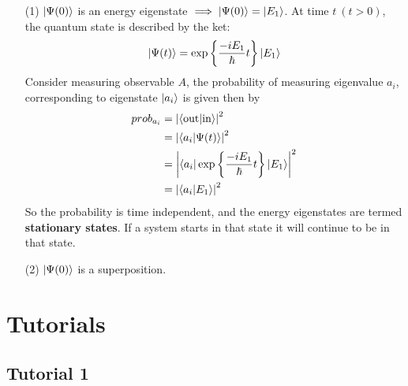 \documentclass[english, 11pt]{article}
\begin{document}
    \begin{itemize}
      \item[(1)] $\left|\Psi(0)\right\rangle$ is an energy eigenstate $\implies \left|\Psi(0)\right\rangle = \left|E_1\right\rangle$. At time $t \ (t > 0)$, the quantum state is described by the ket:
      \[ \left|\Psi(t)\right\rangle = \exp \left\{ \frac{-iE_1}{\hbar} t \right\}\left|E_1\right\rangle \]
      Consider measuring observable $A$, the probability of measuring eigenvalue $a_i$, corresponding to eigenstate $\left|a_i\right\rangle$ is given then by
      \begin{align*}
         prob_{a_i} & = \left| \braket{\mbox{out}}{\mbox{in}} \right|^2 \\
                    & = \left| \braket{a_i}{\Psi(t)} \right|^2 \\
                    & = \left| \bra{a_i}{\expo{\f{-iE_1}{\hbar} t}\ket{E_1}} \right|^2 \\
                    & = \left| \braket{a_i}{E_1} \right|^2
      \end{align*}
      So the probability is time independent, and the energy eigenstates are termed \textbf{stationary states}. If a system starts in that state it will continue to be in that state.
      \item[(2)] $\left|\Psi(0)\right\rangle$ is a superposition.
    \end{itemize}












   \section{Tutorials}

     \subsection{Tutorial 1}
\end{document}
